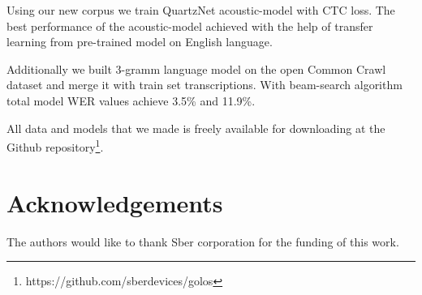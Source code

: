 \documentclass[a4paper]{article}
\begin{document}
Using our new corpus we train QuartzNet acoustic-model with CTC loss. The best performance of the acoustic-model achieved with the help of transfer learning from pre-trained model on English language. 

Additionally we built 3-gramm language model on the open Common Crawl dataset and merge it with train set transcriptions. With beam-search algorithm total model WER values achieve 3.5\% and 11.9\%.

All data and models that we made is freely available for downloading at the Github repository\footnote{https://github.com/sberdevices/golos}.


\section{Acknowledgements}

The authors would like to thank Sber corporation for the funding of this work.





\end{document}
